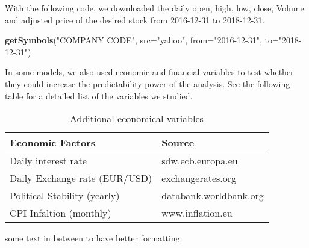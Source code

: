 \documentclass[
  11pt,
]{article}
\newenvironment{Shaded}{\begin{snugshade}}{\end{snugshade}}
\newcommand{\DataTypeTok}[1]{\textcolor[rgb]{0.13,0.29,0.53}{#1}}
\newcommand{\KeywordTok}[1]{\textcolor[rgb]{0.13,0.29,0.53}{\textbf{#1}}}
\newcommand{\NormalTok}[1]{#1}
\newcommand{\StringTok}[1]{\textcolor[rgb]{0.31,0.60,0.02}{#1}}
\begin{document}
With the following code, we downloaded the daily open, high, low, close,
Volume and adjusted price of the desired stock from 2016-12-31 to
2018-12-31.

\begin{Shaded}
\begin{Highlighting}[]
\KeywordTok{getSymbols}\NormalTok{(}\StringTok{"COMPANY CODE"}\NormalTok{, }\DataTypeTok{src=}\StringTok{"yahoo"}\NormalTok{, }\DataTypeTok{from=}\StringTok{"2016-12-31"}\NormalTok{, }\DataTypeTok{to=}\StringTok{"2018-12-31"}\NormalTok{)}
\end{Highlighting}
\end{Shaded}

In some models, we also used economic and financial variables to test
whether they could increase the predictability power of the analysis.
See the following table for a detailed list of the variables we studied.

\begin{table}[H]

\caption{\label{tab:first_half}Additional economical variables}
\centering
\begin{tabular}[t]{ll}
\toprule
Economic
Factors & Source\\
\midrule
Daily interest rate & sdw.ecb.europa.eu\\
Daily Exchange rate
(EUR/USD) & exchangerates.org\\
Political Stability (yearly) & databank.worldbank.org\\
CPI Infaltion (monthly) & www.inflation.eu\\
\bottomrule
\end{tabular}
\end{table}

some text in between to have better formatting
\end{document}
